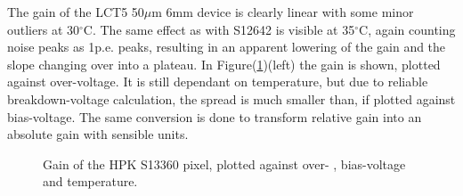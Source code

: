 \documentclass[article,type=msc,colorback,accentcolor=tud9c]{tudthesis}
\begin{document}
The gain of the LCT5 50$\mu$m 6mm device is clearly linear with some minor outliers at 30$^{\circ}$C.  The same effect as with S12642 is visible at 35$^{\circ}$C, again counting noise peaks as 1p.e. peaks, resulting in an apparent lowering of the gain and the slope changing over into a plateau. In Figure(\ref{fig:S13360_Gain})(left) the gain is shown, plotted against over-voltage. It is still dependant on temperature, but due to reliable breakdown-voltage calculation, the spread is much smaller than, if plotted against bias-voltage. The same conversion is done to transform relative gain into an absolute gain with sensible units.
\begin{figure}[h]
\begin{centering}
\caption{Gain of the HPK S13360 pixel, plotted against over- , bias-voltage and temperature. }
\label{fig:S13360_Gain}
\end{centering}
\end{figure}


\newpage
\end{document}

